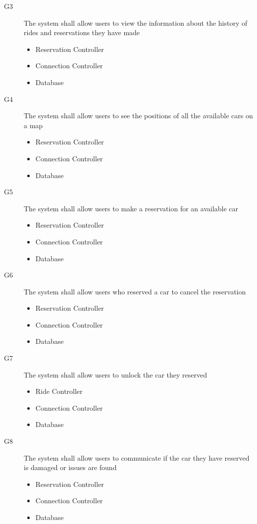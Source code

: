 \documentclass{article}
\begin{document}
\begin{flushleft}
\begin{description}
\item[G3] The system shall allow users to view the information about the history of rides and reservations they have made
\begin{itemize}
\item Reservation Controller
\item Connection Controller
\item Database
\end{itemize}




\item [G4] The system shall allow users to see the positions of all the available cars on a map%
\begin{itemize}
\item Reservation Controller
\item Connection Controller
\item Database
\end{itemize}


\item [G5] The system shall allow users to make a reservation for an available car
\begin{itemize}
\item Reservation Controller
\item Connection Controller
\item Database
\end{itemize}

\item [G6] The system shall allow users who reserved a car to cancel the reservation
\begin{itemize}
\item Reservation Controller
\item Connection Controller
\item Database
\end{itemize}

\item [G7] The system shall allow users to unlock the car they reserved
\begin{itemize}
\item Ride Controller
\item Connection Controller
\item Database
\end{itemize}


\item [G8] The system shall allow users to communicate if the car they have reserved is damaged or issues are found 
\begin{itemize}
\item Reservation Controller
\item Connection Controller
\item Database
\end{itemize}




\end{description}
\end{flushleft}
\end{document}
